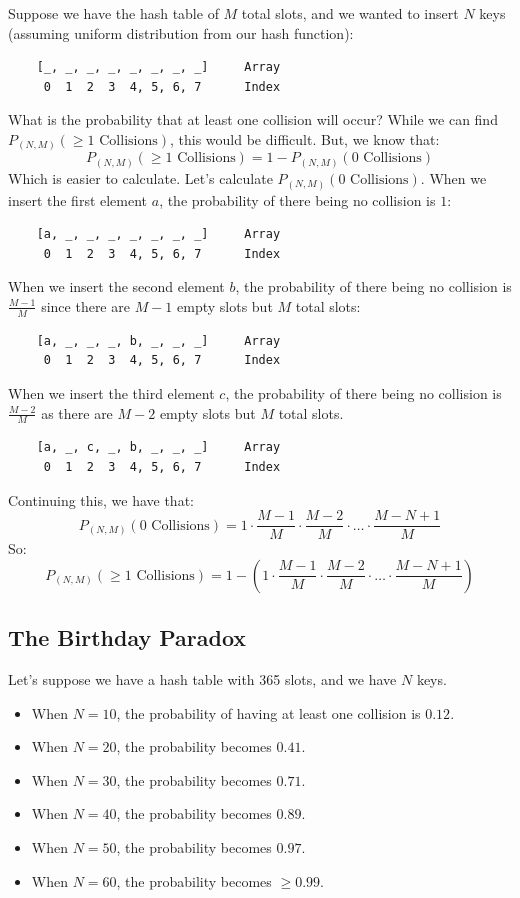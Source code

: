 \documentclass[letterpaper]{article}
\begin{document}
Suppose we have the hash table of $M$ total slots, and we wanted to insert $N$ keys (assuming uniform distribution from our hash function): 
\begin{verbatim}
    [_, _, _, _, _, _, _, _]     Array 
     0  1  2  3  4, 5, 6, 7      Index 
\end{verbatim}
What is the probability that at least one collision will occur? While we can find $P_{(N, M)}(\geq 1 \text{ Collisions})$, this would be difficult. But, we know that: 
\[P_{(N, M)}(\geq 1 \text{ Collisions}) = 1 - P_{(N, M)}(0 \text{ Collisions})\]
Which is easier to calculate. Let's calculate $P_{(N, M)}(0 \text{ Collisions})$. When we insert the first element $a$, the probability of there being no collision is $1$:
\begin{verbatim}
    [a, _, _, _, _, _, _, _]     Array 
     0  1  2  3  4, 5, 6, 7      Index 
\end{verbatim}
When we insert the second element $b$, the probability of there being no collision is $\frac{M - 1}{M}$ since there are $M - 1$ empty slots but $M$ total slots:
\begin{verbatim}
    [a, _, _, _, b, _, _, _]     Array 
     0  1  2  3  4, 5, 6, 7      Index 
\end{verbatim}
When we insert the third element $c$, the probability of there being no collision is $\frac{M - 2}{M}$ as there are $M - 2$ empty slots but $M$ total slots. 
\begin{verbatim}
    [a, _, c, _, b, _, _, _]     Array 
     0  1  2  3  4, 5, 6, 7      Index 
\end{verbatim}
Continuing this, we have that: 
\[P_{(N, M)}(0 \text{ Collisions}) = 1 \cdot \frac{M - 1}{M} \cdot \frac{M - 2}{M} \cdot \dots \cdot \frac{M - N + 1}{M}\]
So: 
\[P_{(N, M)}(\geq 1 \text{ Collisions}) = 1 - \left(1 \cdot \frac{M - 1}{M} \cdot \frac{M - 2}{M} \cdot \dots \cdot \frac{M - N + 1}{M}\right)\]

\subsection{The Birthday Paradox}
Let's suppose we have a hash table with 365 slots, and we have $N$ keys. 
\begin{itemize}
    \item When $N = 10$, the probability of having at least one collision is $0.12$. 
    \item When $N = 20$, the probability becomes $0.41$. 
    \item When $N = 30$, the probability becomes $0.71$.
    \item When $N = 40$, the probability becomes $0.89$. 
    \item When $N = 50$, the probability becomes $0.97$. 
    \item When $N = 60$, the probability becomes $\geq 0.99$. 
\end{itemize}
\end{document}
